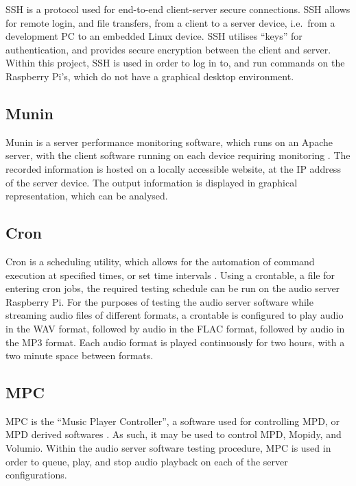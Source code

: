 \documentclass[11pt,a4paper,headinclude=false,footinclude=false]{scrreprt}
\begin{document}
SSH is a protocol used for end-to-end client-server secure
connections\cite{ssh}. SSH allows for remote login, and file transfers,
from a client to a server device, i.e.~from a development PC to an
embedded Linux device. SSH utilises ``keys'' for authentication, and
provides secure encryption between the client and server. Within this
project, SSH is used in order to log in to, and run commands on the
Raspberry Pi's, which do not have a graphical desktop environment.

\subsection{Munin}\label{munin}

Munin is a server performance monitoring software, which runs on an
Apache server, with the client software running on each device requiring
monitoring \cite{MuninMonitoring}. The recorded information is hosted on
a locally accessible website, at the IP address of the server device.
The output information is displayed in graphical representation, which
can be analysed.

\subsection{Cron}\label{cron}

Cron is a scheduling utility, which allows for the automation of command
execution at specified times, or set time intervals \cite{crontab}.
Using a crontable, a file for entering cron jobs, the required testing
schedule can be run on the audio server Raspberry Pi. For the purposes
of testing the audio server software while streaming audio files of
different formats, a crontable is configured to play audio in the WAV
format, followed by audio in the FLAC format, followed by audio in the
MP3 format. Each audio format is played continuously for two hours, with
a two minute space between formats.

\subsection{MPC}\label{mpc}

MPC is the ``Music Player Controller'', a software used for controlling
MPD, or MPD derived softwares \cite{mpc}. As such, it may be used to
control MPD, Mopidy, and Volumio. Within the audio server software
testing procedure, MPC is used in order to queue, play, and stop audio
playback on each of the server configurations.
\end{document}
